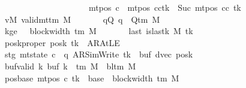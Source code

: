 \begin{isabellebody}
\ \ \ \ \ \ \ \ \ \ \ \ \ \ \ \ \ \ \ \ \ \ \ \ \ \ {\isasymand}\ mt{\isacharunderscore}{\kern0pt}pos\ c{\isacharprime}{\kern0pt}{\isacharprime}{\kern0pt}\ {\isacharequal}{\kern0pt}\ {\isacharparenleft}{\kern0pt}mt{\isacharunderscore}{\kern0pt}pos\ cc{\isacharparenright}{\kern0pt}{\isacharparenleft}{\kern0pt}tk\ {\isacharcolon}{\kern0pt}{\isacharequal}{\kern0pt}\ Suc\ {\isacharparenleft}{\kern0pt}mt{\isacharunderscore}{\kern0pt}pos\ cc\ tk{\isacharparenright}{\kern0pt}{\isacharparenright}{\kern0pt}{\isachardoublequoteclose}\isanewline
\ \ \ \ \ \ \ vM{\isacharcolon}{\kern0pt}\ {\isachardoublequoteopen}valid{\isacharunderscore}{\kern0pt}mttm\ M{\isachardoublequoteclose}\isanewline
\ \ \ \ \ \ \ qQ{\isacharcolon}{\kern0pt}\ {\isachardoublequoteopen}q\ {\isasymin}\ Q{\isacharunderscore}{\kern0pt}tm\ M{\isachardoublequoteclose}\isanewline
\ \ \ \ \ \ \ kge{}{\isacharcolon}{\kern0pt}\ {\isachardoublequoteopen}{}\ {\isasymle}\ block{\isacharunderscore}{\kern0pt}width\ {\isacharparenleft}{\kern0pt}{\isasymGamma}{\isacharunderscore}{\kern0pt}tm\ M{\isacharparenright}{\kern0pt}{\isachardoublequoteclose}\isanewline
\ \ \ \ \ \ \ last{\isacharcolon}{\kern0pt}\ {\isachardoublequoteopen}is{\isacharunderscore}{\kern0pt}last{\isacharunderscore}{\kern0pt}k\ M\ tk{\isachardoublequoteclose}\isanewline
\ \ \ \ \ \ \ poskproper{\isacharcolon}{\kern0pt}\ {\isachardoublequoteopen}posk\ tk\ {\isasymnoteq}\ AR{\isacharunderscore}{\kern0pt}AtLE{\isachardoublequoteclose}\isanewline
\ \ \ \ \ \ \ stg{\isacharcolon}{\kern0pt}\ {\isachardoublequoteopen}mt{\isacharunderscore}{\kern0pt}state\ c{\isacharprime}{\kern0pt}\ {\isacharequal}{\kern0pt}\ {\isacharparenleft}{\kern0pt}q{\isacharcomma}{\kern0pt}\ AR{\isacharunderscore}{\kern0pt}SimWrite{\isacharcomma}{\kern0pt}\ tk{\isacharcomma}{\kern0pt}\ {}{\isacharcomma}{\kern0pt}\ buf{\isacharcomma}{\kern0pt}\ dvec{\isacharcomma}{\kern0pt}\ posk{\isacharparenright}{\kern0pt}{\isachardoublequoteclose}\isanewline
\ \ \ \ \ \ \ buf{\isacharunderscore}{\kern0pt}valid{\isacharcolon}{\kern0pt}\ {\isachardoublequoteopen}{\isasymforall}k{\isachardot}{\kern0pt}\ buf\ k\ {\isasymin}\ {\isasymGamma}{\isacharunderscore}{\kern0pt}tm\ M\ {\isasymunion}\ {\isacharbraceleft}{\kern0pt}bl{\isacharunderscore}{\kern0pt}tm\ M{\isacharbraceright}{\kern0pt}{\isachardoublequoteclose}\isanewline
\ \ \ \ \ \ \ pos{\isacharunderscore}{\kern0pt}base{\isacharcolon}{\kern0pt}\ {\isachardoublequoteopen}mt{\isacharunderscore}{\kern0pt}pos\ c{\isacharprime}{\kern0pt}\ tk\ {\isacharequal}{\kern0pt}\ base\ {\isacharplus}{\kern0pt}\ block{\isacharunderscore}{\kern0pt}width\ {\isacharparenleft}{\kern0pt}{\isasymGamma}{\isacharunderscore}{\kern0pt}tm\ M{\isacharparenright}{\kern0pt}{\isachardoublequoteclose}\isanewline

\end{isabellebody}
